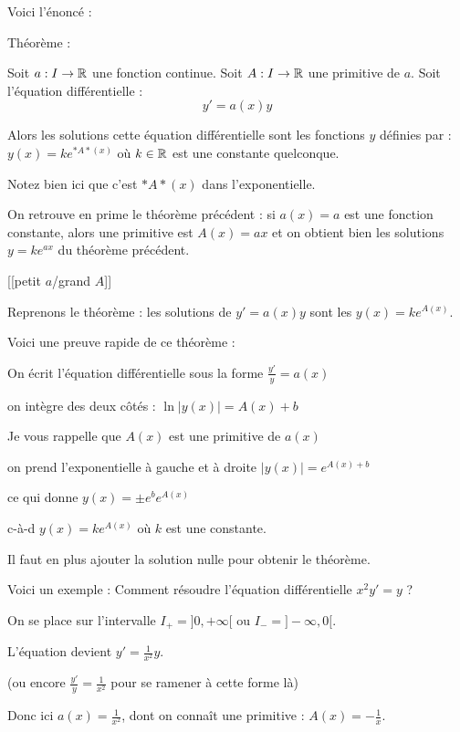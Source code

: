 Voici l'énoncé :

Théorème :

Soit $a : I \to \mathbb{R}$ une fonction continue. Soit $A : I \to \mathbb{R}$ une primitive de $a$.
Soit l'équation différentielle :
$$
   y' = a(x) y   
$$

\change

Alors les solutions cette équation différentielle
sont les fonctions $y$ définies par :
$y(x) = k e^{*A*(x)}$
où $k\in \mathbb{R}$ est une constante quelconque.

Notez bien ici que c'est $*A*(x)$ dans l'exponentielle.

On retrouve en prime le théorème précédent : si $a(x)=a$ est 
une fonction constante, alors une primitive est $A(x)=ax$ 
et on obtient bien les solutions $y = k e^{ax}$ du théorème précédent.

\diapo

[[petit $a$/grand $A$]]

Reprenons le théorème : les solutions de $y' = a(x) y$ 
sont les $y(x) = k e^{A(x)}$.

\change
Voici une preuve rapide de ce théorème :

On écrit l'équation différentielle sous la forme 
$\frac{y'}{y} =  a(x) $

\change
on intègre des deux côtés :
$\ln |y(x)| = A(x) + b$


Je vous rappelle que $A(x)$ est une primitive de $a(x)$

\change
on prend l'exponentielle à gauche et à droite
$|y(x)| = e^{A(x)+b}$

\change
ce qui donne $y(x) = \pm e^b e^{A(x)}$

\change
c-à-d $y(x) = k e^{A(x)}$ où $k$ est une constante.

Il faut en plus ajouter la solution nulle pour obtenir le théorème.

\change

Voici un exemple : Comment résoudre 
l'équation différentielle $x^2y'=y$ ?

\change
On se place sur l'intervalle $I_+=]0,+\infty[$ 
ou $I_-=]-\infty,0[$.

\change
L'équation devient $y'= \frac{1}{x^2}y$. 

(ou encore $\frac{y'}{y}= \frac{1}{x^2}$ pour se ramener à cette forme là)

\change
Donc ici $a(x)=\frac{1}{x^2}$, dont on connaît une primitive :
$A(x)=-\frac1x$. 

